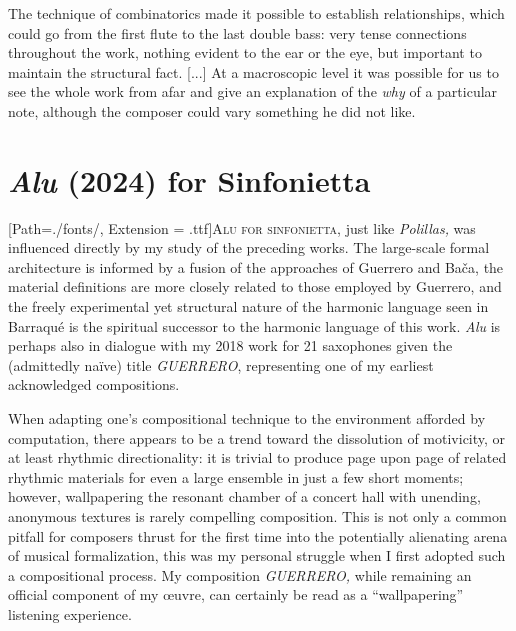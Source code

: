 \begin{savequote}[75mm]
The technique of combinatorics made it possible to establish relationships, which could go from the first flute to the last double bass: very tense connections throughout the work, nothing evident to the ear or the eye, but important to maintain the structural fact. [...] At a macroscopic level it was possible for us to see the whole work from afar and give an explanation of the \emph{why} of a particular note, although the composer could vary something he did not like.
\end{savequote}

\chapter{\textit{Alu} (2024) for Sinfonietta}
\label{Chapter4}

\lettrine[lines=3]{\setmainfont{GoudyInitialen}[Path=./fonts/, Extension = .ttf]\color{printGreen}A}{lu for sinfonietta,} just like \textit{Polillas,} was influenced directly by my study of the preceding works. The large-scale formal architecture is informed by a fusion of the approaches of Guerrero and Bača, the material definitions are more closely related to those employed by Guerrero, and the freely experimental yet structural nature of the harmonic language seen in Barraqué is the spiritual successor to the harmonic language of this work. \textit{Alu} is perhaps also in dialogue with my 2018 work for 21 saxophones given the (admittedly naïve) title \textit{GUERRERO}, representing one of my earliest acknowledged compositions.

When adapting one's compositional technique to the environment afforded by computation, there appears to be a trend toward the dissolution of motivicity, or at least rhythmic directionality: it is trivial to produce page upon page of related rhythmic materials for even a large ensemble in just a few short moments; however, wallpapering the resonant chamber of a concert hall with unending, anonymous textures is rarely compelling composition. This is not only a common pitfall for composers thrust for the first time into the potentially alienating arena of musical formalization, this was my personal struggle when I first adopted such a compositional process. My composition \textit{GUERRERO,} while remaining an official component of my œuvre, can certainly be read as a ``wallpapering'' listening experience.

